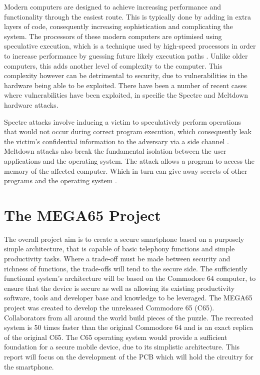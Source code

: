 Modern computers are designed to achieve increasing performance and functionality through the easiest route. This is typically done by adding in extra layers of code, consequently increasing sophistication and complicating the system. The processors of these modern computers are optimised using speculative execution, which is a technique used by high-speed processors in order to increase performance by guessing future likely execution paths \cite{RN16}. Unlike older computers, this adds another level of complexity to the computer. This complexity however can be detrimental to security, due to vulnerabilities in the hardware being able to be exploited. There have been a number of recent cases where vulnerabilities have been exploited, in specific the Spectre and Meltdown hardware attacks. 

Spectre attacks involve inducing a victim to speculatively perform operations that would not occur during correct program execution, which consequently leak the victim’s confidential information to the adversary via a side channel \cite{RN16}.  
Meltdown attacks also break the fundamental isolation between the user applications and the operating system. The attack allows a program to access the memory of the affected computer. Which in turn can give away secrets of other programs and the operating system \cite{RN3}. 


\section{The MEGA65 Project}

	The overall project aim is to create a secure smartphone based on a purposely simple architecture, that is capable of basic telephony functions and simple productivity tasks. Where a trade-off must be made between security and richness of functions, the trade-offs will tend to the secure side. The sufficiently functional system’s architecture will be based on the Commodore 64 computer, to ensure that the device is secure as well as allowing its existing productivity software, tools and developer base and knowledge to be leveraged. 
	The MEGA65 project was created to develop the unreleased Commodore 65 (C65). Collaborators from all around the world build pieces of the puzzle. The recreated system is 50 times faster than the original Commodore 64 and is an exact replica of the original C65. The C65 operating system would provide a sufficient foundation for a secure mobile device, due to its simplistic architecture.  
	This report will focus on the development of the PCB which will hold the circuitry for the smartphone. 


